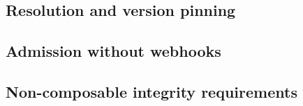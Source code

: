 \subsection{Resolution and version pinning}

\subsection{Admission without webhooks}

\subsection{Non-composable integrity requirements}
